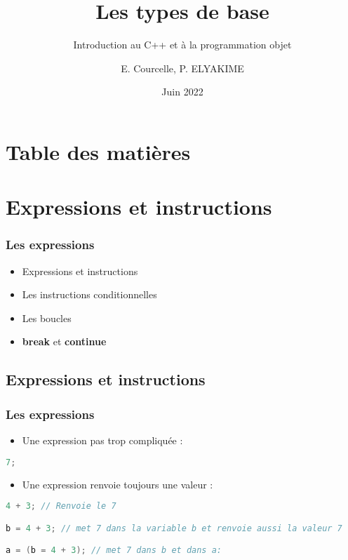 \documentclass{beamer}
\title{Les types de base}
\subtitle{Introduction au C++ et à la programmation objet}
\author{E. Courcelle, P. ELYAKIME}\institute{CALMIP UMS 3669, IMFT UMR 5502}
\date{Juin 2022}
\begin{document}
\begin{frame}
\titlepage
\end{frame}

\section*{Table des matières}
\begin{frame}
\tableofcontents
\end{frame}


\section{Expressions et instructions}

\begin{frame}[fragile=singleslide,shrink=20]
\frametitle {Les expressions}
\begin{itemize}
\item{Expressions et instructions}
\item{Les instructions conditionnelles}
\item{Les boucles}
\item{\textbf{break} et \textbf{continue}}
\end{itemize}

\end{frame}

\subsection{Expressions et instructions}

\begin{frame}[fragile=singleslide,shrink=20]
\frametitle {Les expressions}
\begin{itemize}
\item{Une expression pas trop compliquée :}
\end{itemize}

\begin{lstlisting}[language=c++]
7;
\end{lstlisting}

\begin{itemize}
\item{Une expression renvoie toujours une valeur : }
\end{itemize}


\begin{lstlisting}[language=c++]
4 + 3; // Renvoie le 7

b = 4 + 3; // met 7 dans la variable b et renvoie aussi la valeur 7

a = (b = 4 + 3); // met 7 dans b et dans a:
\end{lstlisting}

\end{frame}
\end{document}
